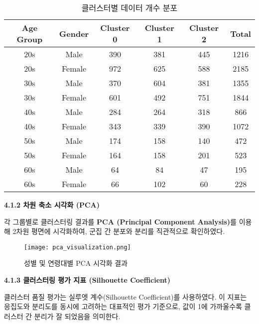 \documentclass[sigconf]{acmart}
\begin{document}
\begin{CJK}{UTF8}{mj}
\begin{table}[H]
\centering
\caption{클러스터별 데이터 개수 분포}
\begin{tabular}{|c|c|c|c|c|c|}
\hline
\textbf{Age Group} & \textbf{Gender} & \textbf{Cluster 0} & \textbf{Cluster 1} & \textbf{Cluster 2} & \textbf{Total} \\
\hline
20s & Male   & 390  & 381  & 445  & 1216 \\
20s & Female & 972  & 625  & 588  & 2185 \\
30s & Male   & 370  & 604  & 381  & 1355 \\
30s & Female & 601  & 492  & 751  & 1844 \\
40s & Male   & 284  & 264  & 318  & 866  \\
40s & Female & 343  & 339  & 390  & 1072 \\
50s & Male   & 174  & 158  & 140  & 472  \\
50s & Female & 164  & 158  & 201  & 523  \\
60s & Male   & 64   & 84   & 47   & 195  \\
60s & Female & 66   & 102  & 60   & 228  \\
\hline
\end{tabular}
\end{table}

\noindent\textbf{4.1.2 차원 축소 시각화 (PCA)}\par

각 그룹별로 클러스터링 결과를 \textbf{PCA (Principal Component Analysis)}를 이용해 2차원 평면에 시각화하여, 군집 간 분포와 분리를 직관적으로 확인하였다.

\begin{figure}[H]
  \centering
  \texttt{[image: pca\_visualization.png]}
  \caption{성별 및 연령대별 PCA 시각화 결과}
  \label{fig:pca_all}
\end{figure}

\noindent\textbf{4.1.3 클러스터링 평가 지표 (Silhouette Coefficient)}\par

클러스터 품질 평가는 실루엣 계수(Silhouette Coefficient)를 사용하였다. 이 지표는 응집도와 분리도를 동시에 고려하는 대표적인 평가 기준으로, 값이 1에 가까울수록 클러스터 간 분리가 잘 되었음을 의미한다.


\end{CJK}
\end{document}
